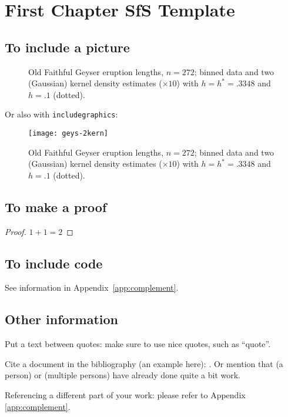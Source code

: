 \chapter{First Chapter SfS Template} 

\section{To include a picture}
\begin{figure}[hbt!]
  \caption[Geyser data: binned histogram, Silverman's and another kernel]
  {Old Faithful Geyser eruption lengths, $n=272$; binned data and two
    (Gaussian) kernel density estimates ($\times 10$) with $h=h^*= .3348$
    and $h= .1$ (dotted).}
  \label{fig:geys1}
\end{figure}

Or also with \texttt{includegraphics}:
\begin{figure}[hbt!]
  \centering
  \texttt{[image: geys-2kern]}
  \caption[Geyser data: binned histogram, Silverman's and another
  kernel]
  {Old Faithful Geyser eruption lengths, $n=272$; binned data and two
    (Gaussian) kernel density estimates ($\times 10$) with $h=h^*= .3348$
    and $h= .1$ (dotted).}
  \label{fig:geys2}
\end{figure}

\section{To make a proof}
\begin{proof}
  $1 + 1 = 2$
\end{proof}

\section{To include \Rp code}
See information in Appendix~\ref{app:complement}.


\section{Other information}
Put a text between quotes: make sure to use nice quotes, such as ``quote''.

Cite a document in the bibliography (an example here): \cite{Gelman2008}.
Or mention that \citeauthor{Konis2007} (a person) or \citeauthor{Hastie2009} (multiple
persons) have already done quite a bit work.

Referencing a different part of your work: please refer to Appendix \ref{app:complement}.
